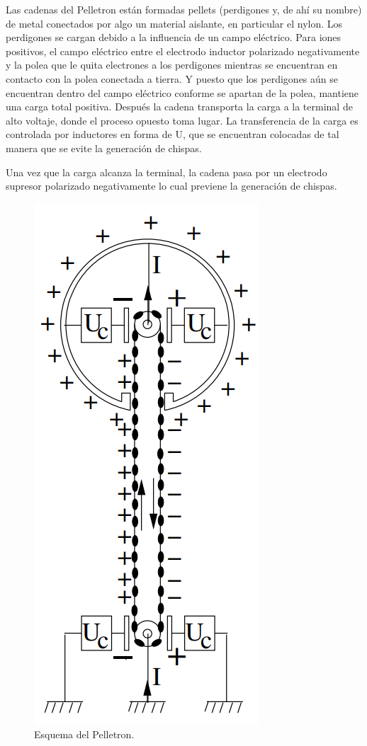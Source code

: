 \documentclass[12pt]{article}
\theoremstyle{break}
\theoremstyle{nonumberbreak}
\begin{document}
    Las cadenas del Pelletron están formadas pellets (perdigones y, de ahí su nombre) de metal conectados por algo un material aislante, en particular el nylon. Los perdigones se cargan debido a la influencia de un campo eléctrico. Para iones positivos, el campo eléctrico entre el electrodo inductor polarizado negativamente y la polea que le quita electrones a los perdigones mientras se encuentran en contacto con la polea conectada a tierra. Y puesto que los perdigones aún se encuentran dentro del campo eléctrico conforme se apartan de la polea, mantiene una carga total positiva. Después la cadena transporta la carga a la terminal de alto voltaje, donde el proceso opuesto toma lugar. La transferencia de la carga es controlada por inductores en forma de U, que se encuentran colocadas de tal manera que se evite la generación de chispas.\cite{Hinterberger:1005042}

    Una vez que la carga alcanza la terminal, la cadena pasa por un electrodo supresor polarizado negativamente lo cual previene la generación de chispas.
    
    \begin{figure}[htb]
        \centering
        \includegraphics[scale=0.5]{pelletron}
        \caption{Esquema del Pelletron.\cite{Hinterberger:1005042}}
        \label{fig:pelletron}
    \end{figure}
\end{document}
